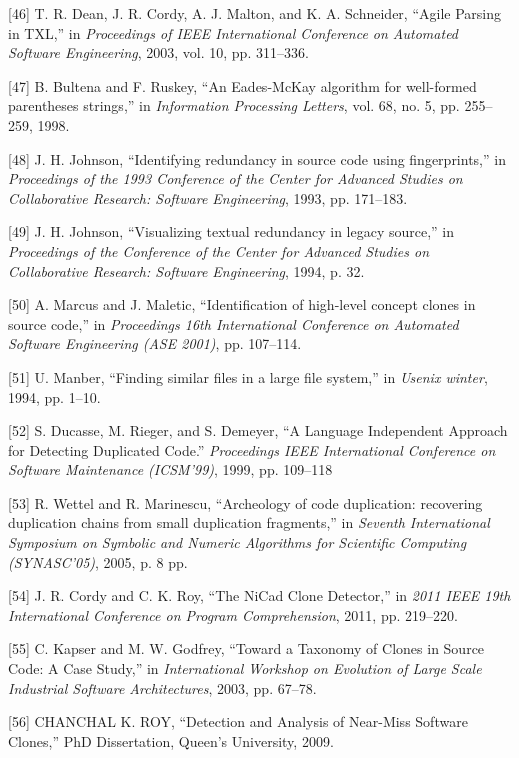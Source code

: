 {[}46{]} T. R. Dean, J. R. Cordy, A. J. Malton, and K. A. Schneider,
``Agile Parsing in TXL,'' in \emph{Proceedings of IEEE International
Conference on Automated Software Engineering}, 2003, vol. 10, pp. 311--336.

{[}47{]} B. Bultena and F. Ruskey, ``An Eades-McKay algorithm for
well-formed parentheses strings,'' in \emph{Information Processing
Letters}, vol. 68, no. 5, pp. 255--259, 1998.

{[}48{]} J. H. Johnson, ``Identifying redundancy in source code using
fingerprints,'' in \emph{Proceedings of the 1993 Conference
of the Center for Advanced Studies on Collaborative Research: Software
Engineering}, 1993, pp. 171--183.

{[}49{]} J. H. Johnson, ``Visualizing textual redundancy in legacy
source,'' in \emph{Proceedings of the Conference
of the Center for Advanced Studies on Collaborative Research: Software
Engineering}, 1994, p. 32.

{[}50{]} A. Marcus and J. Maletic, ``Identification of high-level
concept clones in source code,'' in \emph{Proceedings 16th 
International Conference on Automated Software Engineering (ASE 2001)},
pp. 107--114.

{[}51{]} U. Manber, ``Finding similar files in a large file system,'' in
\emph{Usenix winter}, 1994, pp. 1--10.

{[}52{]} S. Ducasse, M. Rieger, and S. Demeyer, ``A Language Independent
Approach for Detecting Duplicated Code.'' \emph{Proceedings IEEE International Conference on Software Maintenance (ICSM'99)}, 1999, pp. 109--118

{[}53{]} R. Wettel and R. Marinescu, ``Archeology of code duplication:
recovering duplication chains from small duplication fragments,'' in
\emph{Seventh International Symposium on Symbolic and Numeric Algorithms
for Scientific Computing (SYNASC'05)}, 2005, p. 8 pp.

{[}54{]} J. R. Cordy and C. K. Roy, ``The NiCad Clone Detector,'' in
\emph{2011 IEEE 19th International Conference on Program Comprehension},
2011, pp. 219--220.

{[}55{]} C. Kapser and M. W. Godfrey, ``Toward a Taxonomy of Clones in
Source Code: A Case Study,'' in \emph{International Workshop on
Evolution of Large Scale Industrial Software Architectures}, 2003, pp.
67--78.

{[}56{]} CHANCHAL K. ROY, ``Detection and Analysis of Near-Miss Software
Clones,'' PhD Dissertation, Queen's University, 2009.

